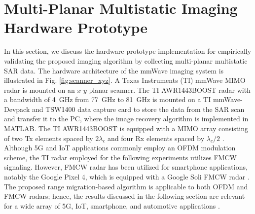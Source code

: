 \documentclass{ieeeaccess}
\begin{document}
\section{Multi-Planar Multistatic Imaging Hardware Prototype}
\label{sec:prototype}
In this section, we discuss the hardware prototype implementation for empirically validating the proposed imaging algorithm by collecting multi-planar multistatic SAR data.
The hardware architecture of the mmWave imaging system is illustrated in Fig. \ref{fig:scanner_xyz}.
A Texas Instruments (TI) mmWave MIMO radar is mounted on an $x$-$y$ planar scanner. 
The TI AWR1443BOOST radar with a bandwidth of \mbox{4 GHz} from \mbox{77 GHz} to \mbox{81 GHz} is mounted on a TI mmWave-Devpack and TSW1400 data capture card to store the data from the SAR scan and transfer it to the PC, where the image recovery algorithm is implemented in MATLAB.
The TI AWR1443BOOST is equipped with a MIMO array consisting of two Tx elements spaced by $2\lambda_c$ and four Rx elements spaced by $\lambda_c/2$ \cite{yanik2019sparse}.
Although 5G and IoT applications commonly employ an OFDM modulation scheme, the TI radar employed for the following experiments utilizes FMCW signaling. 
However, FMCW radar has been utilized for smartphone applications, notably the Google Pixel 4, which is equipped with a Google Soli FMCW radar \cite{basrawi2021reverse}. 
The proposed range migration-based algorithm is applicable to both OFDM and FMCW radars; hence, the results discussed in the following section are relevant for a wide array of 5G, IoT, smartphone, and automotive applications \cite{zhang2015ofdm}.
\end{document}
